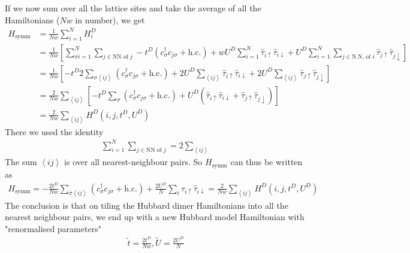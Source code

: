 \documentclass[12pt]{article}
\numberwithin{equation}{section}
\begin{document}
If we now sum over all the lattice sites and take the average of all the Hamiltonians (\(Nw\) in number), we get
\begin{equation}\begin{aligned}
	H_\text{symm} &= \frac{1}{Nw}\sum_{i=1}^N H^D_{i} \\
		      &= \frac{1}{Nw}\left[\sum_{\sigma i=1}^N\sum_{j \in \text{NN of }j}-t^D\left(c^\dagger_{\sigma}c_{j\sigma} + \text{h.c.}\right) + w U^D\sum_{i=1}^N \hat \tau_{i \uparrow}\hat \tau_{i \downarrow} + U^D\sum_{i=1}^N\sum_{j \in \text{N.N. of }i}\hat \tau_{j \uparrow}\hat \tau_{j \downarrow}\right] \\
		      &= \frac{1}{Nw}\left[-t^D 2\sum_{\sigma \left<ij\right>}\left(c^\dagger_{\sigma}c_{j\sigma} + \text{h.c.}\right) + 2 U^D\sum_{\left<ij\right>} \hat \tau_{i \uparrow}\hat \tau_{i \downarrow} + 2 U^D\sum_{\left<ij\right>} \hat \tau_{j \uparrow}\hat \tau_{j \downarrow}\right]\\
		      &= \frac{2}{Nw}\sum_{\left<ij\right>}\left[-t^D \sum_\sigma \left(c^\dagger_{\sigma}c_{j\sigma} + \text{h.c.}\right) + U^D\left(\hat \tau_{i \uparrow}\hat \tau_{i \downarrow} + \hat \tau_{j \uparrow}\hat \tau_{j \downarrow}\right)\right]\\
		      &= \frac{2}{Nw}\sum_{\left<ij \right>} H^D(i,j,t^D, U^D)
\end{aligned}\end{equation}
There we used the identity
\begin{equation}\begin{aligned}
	\sum_{i=1}^N\sum_{j \in \text{NN of }j} = 2\sum_{\left<ij\right>}
\end{aligned}\end{equation}
The sum $\left<ij\right>$ is over all nearest-neighbour pairs. So $H_\text{symm}$ can thus be written as
\begin{equation}\begin{aligned}
	\label{H_tiled}
	H_\text{symm} = - \frac{2t^D}{Nw}\sum_{\sigma \left<ij \right>}\left(c^\dagger_{\sigma}c_{j\sigma} + \text{h.c.}\right) + \frac{2U^D}{N}\sum_i \hat \tau_{i \uparrow}\hat \tau_{i \downarrow} = \frac{2}{Nw}\sum_{\left<ij \right>} H^D(i,j,t^D, U^D)
\end{aligned}\end{equation}
The conclusion is that on tiling the Hubbard dimer Hamiltonians into all the nearest neighbour pairs, we end up with a new Hubbard model Hamiltonian with "renormalised parameters"
\begin{equation}\begin{aligned}
	\tilde t = \frac{2t^D}{Nw}, \tilde U = \frac{2U^D}{N}
\end{aligned}\end{equation}
\end{document}

